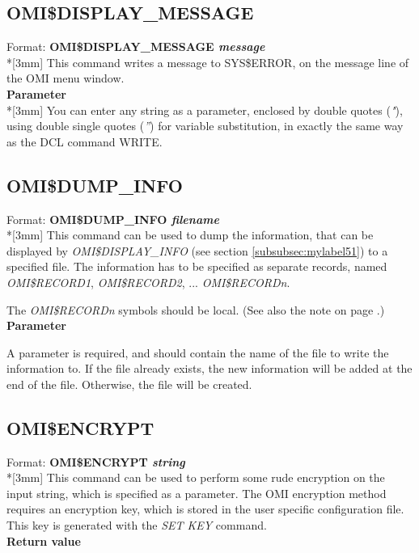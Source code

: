 \documentclass[a4paper]{book}
\renewcommand{\indent}{\hspace*{5mm}}
\begin{document}
\subsection{OMI{\$}DISPLAY{\_}MESSAGE}
\label{subsubsec:mylabel52}
\indent Format: \textbf{OMI{\$}DISPLAY{\_}MESSAGE \textit{message}}\\*[3mm]
This command writes a message to SYS{\$}ERROR, on the message line of the 
OMI menu window.\\[3mm]
\textbf{Parameter}\\*[3mm]
You can enter any string as a parameter, enclosed by double quotes (\textsl{"}), 
using double single quotes (\textsl{''}) for variable substitution, in exactly the 
same way as the DCL command WRITE.

\subsection{OMI{\$}DUMP{\_}INFO}
\label{subsubsec:mylabel53}

\indent Format: \textbf{OMI{\$}DUMP{\_}INFO \textit{filename}}\\*[3mm]
This command can be used to dump the information, that can be displayed by 
\textsl{OMI{\$}DISPLAY{\_}INFO} (see section \ref{subsubsec:mylabel51}) to a 
specified file. The information has to be specified as separate records, 
named \textsl{OMI{\$}RECORD1}, \textsl{OMI{\$}RECORD2}, ... \textsl{OMI{\$}RECORD\textit{n}}.

The \textsl{OMI{\$}RECORD\textit{n}} symbols should be local.
(See also the note on page \pageref{note:dispinfo}.)\\[3mm]
\textbf{Parameter}

\noindent A parameter is required, and should contain the name of the file to write 
the information to. If the file already exists, the new information will be 
added at the end of the file. Otherwise, the file will be created.


\subsection{OMI{\$}ENCRYPT}
\label{subsubsec:mylabel54}

\indent Format: \textbf{OMI{\$}ENCRYPT \textit{string}}\\*[3mm]
This command can be used to perform some rude encryption on the input 
string, which is specified as a parameter. The OMI encryption method 
requires an encryption key, which is stored in the user specific 
configuration file. This key is generated with the \textsl{SET KEY} command.\\[3mm]
\textbf{Return value}
\end{document}
